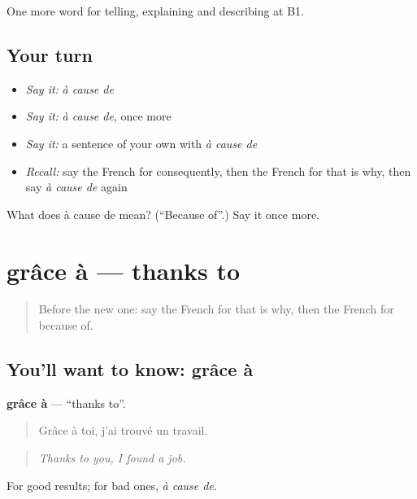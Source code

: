 \begin{grammarlens}[title={What you've built}]
One more word for telling, explaining and describing at B1.
\end{grammarlens}

\subsection*{Your turn}
\begin{itemize}
\raggedright
  \item \emph{Say it:} \emph{à cause de}
  \item \emph{Say it:} \emph{à cause de}, once more
  \item \emph{Say it:} a sentence of your own with \emph{à cause de}
  \item \emph{Recall:} say the French for consequently, then the French for that is why, then say \emph{à cause de} again
\end{itemize}

\begin{tcolorbox}[breakable,colback=teal!4,colframe=teal!35!black,title={Before you move on}]
What does à cause de mean? (\textquotedblleft{}Because of\textquotedblright{}.) Say it once more.
\end{tcolorbox}
\section[grâce à]{grâce à — thanks to}

\label{lesson:FR-C348-grace-a}



\begin{quote}
Before the new one: say the French for that is why, then the French for because of.
\end{quote}

\subsection*{You'll want to know: grâce à}
\textbf{grâce à} — \textquotedblleft{}thanks to\textquotedblright{}.

\begin{quote}
Grâce à toi, j'ai trouvé un travail.
\end{quote}

\begin{quote}
\emph{Thanks to you, I found a job.}
\end{quote}

For good results; for bad ones, \emph{à cause de}.

